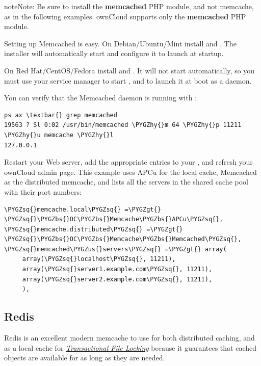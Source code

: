 \documentclass[letterpaper,10pt,english]{sphinxmanual}
\def\PYGZbs{\char`\\}
\def\PYGZus{\char`\_}
\def\PYGZgt{\char`\>}
\def\PYGZhy{\char`\-}
\def\PYGZsq{\char`\'}
\renewcommand\PYGZsq{\textquotesingle}
\begin{document}
\begin{notice}{note}{Note:}
Be sure to install the \textbf{memcached} PHP module, and not memcache, as
in the following examples. ownCloud supports only the \textbf{memcached} PHP
module.
\end{notice}

Setting up Memcached is easy. On Debian/Ubuntu/Mint install  and
. The installer will automatically start  and
configure it to launch at startup.

On Red Hat/CentOS/Fedora install  and
. It will not start automatically, so you must use
your service manager to start , and to launch it at boot as a
daemon.

You can verify that the Memcached daemon is running with :

\begin{Verbatim}[commandchars=\\\{\}]
ps ax \textbar{} grep memcached
19563 ? Sl 0:02 /usr/bin/memcached \PYGZhy{}m 64 \PYGZhy{}p 11211 \PYGZhy{}u memcache \PYGZhy{}l
127.0.0.1
\end{Verbatim}

Restart your Web server, add the appropriate entries to your
, and refresh your ownCloud admin page. This example uses APCu
for the local cache, Memcached as the distributed memcache, and lists all the
servers in the shared cache pool with their port numbers:

\begin{Verbatim}[commandchars=\\\{\}]
\PYGZsq{}memcache.local\PYGZsq{} =\PYGZgt{} \PYGZsq{}\PYGZbs{}OC\PYGZbs{}Memcache\PYGZbs{}APCu\PYGZsq{},
\PYGZsq{}memcache.distributed\PYGZsq{} =\PYGZgt{} \PYGZsq{}\PYGZbs{}OC\PYGZbs{}Memcache\PYGZbs{}Memcached\PYGZsq{},
\PYGZsq{}memcached\PYGZus{}servers\PYGZsq{} =\PYGZgt{} array(
     array(\PYGZsq{}localhost\PYGZsq{}, 11211),
     array(\PYGZsq{}server1.example.com\PYGZsq{}, 11211),
     array(\PYGZsq{}server2.example.com\PYGZsq{}, 11211),
     ),
\end{Verbatim}


\subsection{Redis}
\label{configuration_server/caching_configuration:id3}
Redis is an excellent modern memcache to use for both distributed caching, and
as a local cache for {\hyperref[configuration_files/files_locking_transactional::doc]{\emph{\emph{Transactional File Locking}}}} because it guarantees
that cached objects are available for as long as they are needed.
\end{document}
